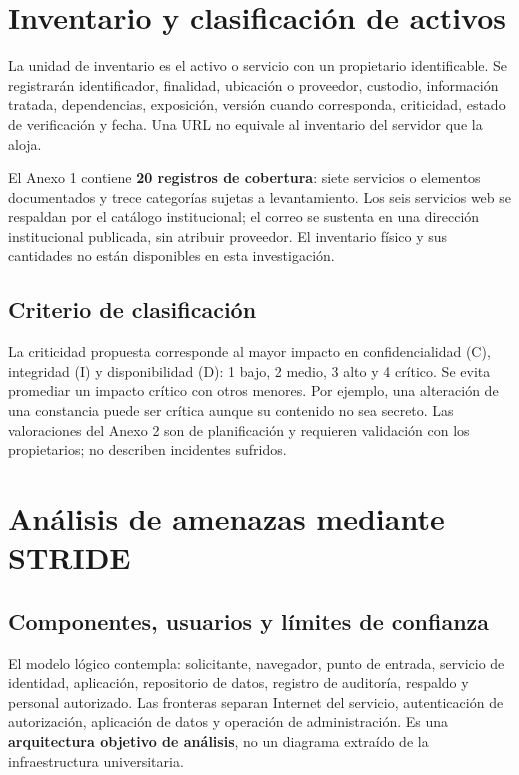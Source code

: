 \documentclass[10pt,a4paper]{article}
\begin{document}
\section{Inventario y clasificación de activos}
La unidad de inventario es el activo o servicio con un propietario identificable. Se registrarán identificador, finalidad, ubicación o proveedor, custodio, información tratada, dependencias, exposición, versión cuando corresponda, criticidad, estado de verificación y fecha. Una URL no equivale al inventario del servidor que la aloja.

El Anexo 1 contiene \textbf{20 registros de cobertura}: siete servicios o elementos documentados y trece categorías sujetas a levantamiento. Los seis servicios web se respaldan por el catálogo institucional; el correo se sustenta en una dirección institucional publicada, sin atribuir proveedor. El inventario físico y sus cantidades no están disponibles en esta investigación.

\subsection{Criterio de clasificación}
La criticidad propuesta corresponde al mayor impacto en confidencialidad (C), integridad (I) y disponibilidad (D): 1 bajo, 2 medio, 3 alto y 4 crítico. Se evita promediar un impacto crítico con otros menores. Por ejemplo, una alteración de una constancia puede ser crítica aunque su contenido no sea secreto. Las valoraciones del Anexo 2 son de planificación y requieren validación con los propietarios; no describen incidentes sufridos.

\section{Análisis de amenazas mediante STRIDE}
\subsection{Componentes, usuarios y límites de confianza}
El modelo lógico contempla: solicitante, navegador, punto de entrada, servicio de identidad, aplicación, repositorio de datos, registro de auditoría, respaldo y personal autorizado. Las fronteras separan Internet del servicio, autenticación de autorización, aplicación de datos y operación de administración. Es una \textbf{arquitectura objetivo de análisis}, no un diagrama extraído de la infraestructura universitaria.
\end{document}
